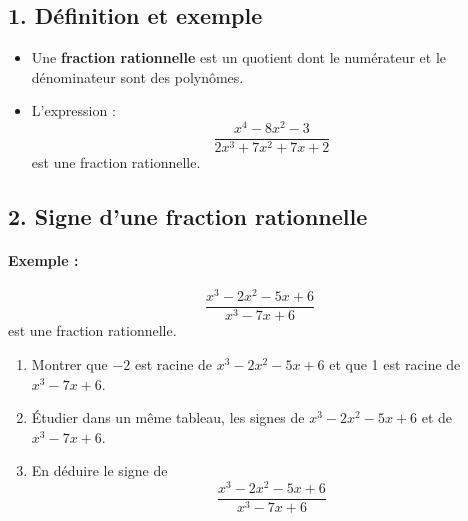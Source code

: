 \documentclass[12pt,a4paper]{article}
\newcounter{exemple}
\begin{document}
\subsection*{1. Définition et exemple}

\begin{itemize}
    \item Une \textbf{fraction rationnelle} est un quotient dont le numérateur et le dénominateur sont des polynômes.
    \item L'expression :
    \[
    \frac{x^4 - 8x^2 - 3}{2x^3 + 7x^2 + 7x + 2}
    \]
    est une fraction rationnelle.
\end{itemize}

\subsection*{2. Signe d'une fraction rationnelle}

\paragraph{Exemple :}
\[
\frac{x^3 - 2x^2 - 5x + 6}{x^3 - 7x + 6}
\]
est une fraction rationnelle.

\begin{enumerate}
    \item Montrer que \(-2\) est racine de \( x^3 - 2x^2 - 5x + 6 \) et que 1 est racine de \( x^3 - 7x + 6 \).
    \item Étudier dans un même tableau, les signes de \( x^3 - 2x^2 - 5x + 6 \) et de \( x^3 - 7x + 6 \).
    \item En déduire le signe de
    \[
    \frac{x^3 - 2x^2 - 5x + 6}{x^3 - 7x + 6}
    \]
\end{enumerate}
\end{document}
